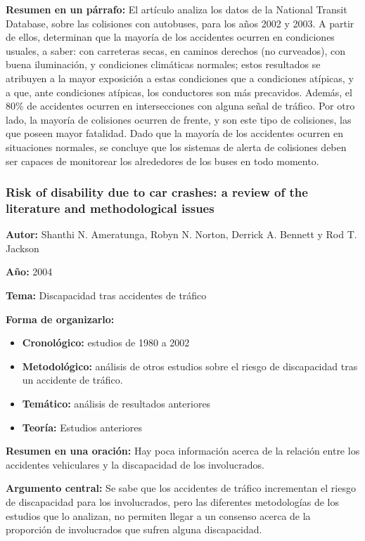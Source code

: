\documentclass{book}
\begin{document}
\textbf{Resumen en un párrafo:} El artículo analiza los datos de la National Transit Database, sobre las colisiones con autobuses, para los años 2002 y 2003. A partir de ellos, determinan que la mayoría de los accidentes ocurren en condiciones usuales, a saber: con carreteras secas, en caminos derechos (no curveados), con buena iluminación, y condiciones climáticas normales; estos resultados se atribuyen a la mayor exposición a estas condiciones que a condiciones atípicas, y a que, ante condiciones atípicas, los conductores son más precavidos. Además, el 80\% de accidentes ocurren en intersecciones con alguna señal de tráfico. Por otro lado, la mayoría de colisiones ocurren de frente, y son este tipo de colisiones, las que poseen mayor fatalidad. Dado que la mayoría de los accidentes ocurren en situaciones normales, se concluye que los sistemas de alerta de colisiones deben ser capaces de monitorear los alrededores de los buses en todo momento.


\subsubsection{Risk of disability due to car crashes: a review of the literature and methodological issues}
\textbf{Autor:} Shanthi N. Ameratunga, Robyn N. Norton, Derrick A. Bennett y Rod T. Jackson

\textbf{Año:} 2004

\textbf{Tema:} Discapacidad tras accidentes de tráfico

\textbf{Forma de organizarlo:}

\begin{itemize}
\setlength{\itemindent}{0.5in}
    \item \textbf{Cronológico:} estudios de 1980 a 2002
    \item \textbf{Metodológico:} análisis de otros estudios sobre el riesgo de discapacidad tras un accidente de tráfico.
    \item \textbf{Temático:} análisis de resultados anteriores
    \item \textbf{Teoría:} Estudios anteriores
\end{itemize}

\textbf{Resumen en una oración:} Hay poca información acerca de la relación entre los accidentes vehiculares y la discapacidad de los involucrados.

\textbf{Argumento central:} Se sabe que los accidentes de tráfico incrementan el riesgo de discapacidad para los involucrados, pero las diferentes metodologías de los estudios que lo analizan, no permiten llegar a un consenso acerca de la proporción de involucrados que sufren alguna discapacidad.
\end{document}
